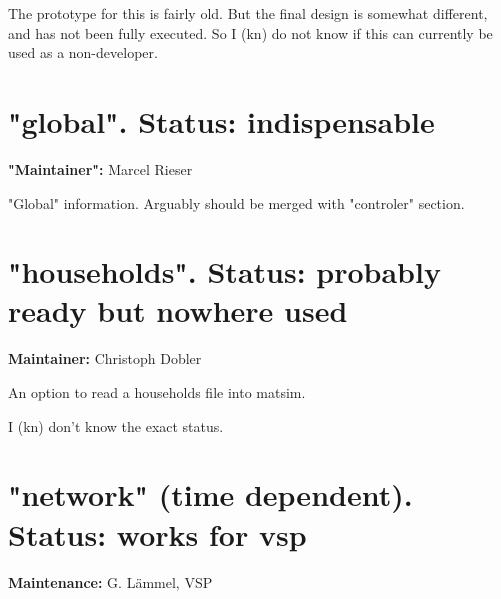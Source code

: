 \documentclass[a4paper,11pt]{report}
\begin{document}
The prototype for this is fairly old. But the final design is  somewhat different, and has not been fully executed. So I (kn) do  not know if this can currently be used as a non-developer.

\vfill\eject
\section{"global". Status: indispensable}

\textbf{"Maintainer":} Marcel Rieser

"Global" information. Arguably should be merged with "controler" section.

\vfill\eject
\section{"households". Status: probably ready but nowhere used}

\textbf{Maintainer:} Christoph Dobler

An option to read a households file into matsim.

I (kn) don't know the exact status.

\vfill\eject
\section{"network" (time dependent). Status: works for vsp}

\textbf{Maintenance:} G. Lämmel, VSP
\end{document}
